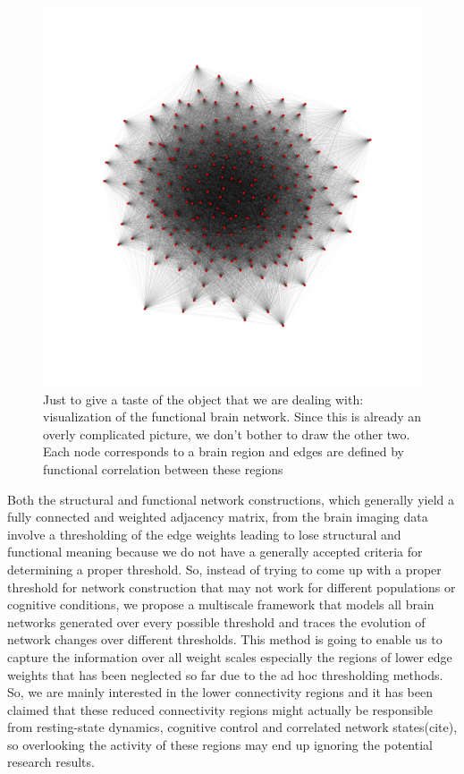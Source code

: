 \documentclass[9pt,twocolumn,twoside,lineno]{pnas-new}
\begin{document}
\begin{figure}%
\centering
\includegraphics[width=.8\linewidth]{spring.jpg}
\caption{Just to give a taste of the object that we are dealing with: visualization of the functional brain network. Since this is already an overly complicated picture, we don't bother to draw the other two. Each node corresponds to a brain region and edges are defined by functional correlation between  these regions}
\label{fig:network}
\end{figure}

Both the structural and functional network constructions, which generally yield a fully connected and weighted adjacency matrix, from the brain imaging data involve a thresholding of the edge weights leading to lose structural and functional meaning because we do not have a generally accepted criteria for determining a proper threshold. So, instead of trying to come up with a proper threshold for network construction that may not work for different populations or cognitive conditions, we propose a multiscale framework that models all brain networks generated over every possible threshold and traces the evolution of network changes over different thresholds. This method is going to enable us to capture the information over all weight scales especially the regions of lower edge weights that has been neglected so far due to the ad hoc thresholding methods. So, we are mainly interested in the lower connectivity regions and it has been claimed that these reduced connectivity regions might actually be responsible from resting-state dynamics, cognitive control and correlated network states(cite), so overlooking the activity of these regions may end up ignoring the potential research results.
\end{document}
